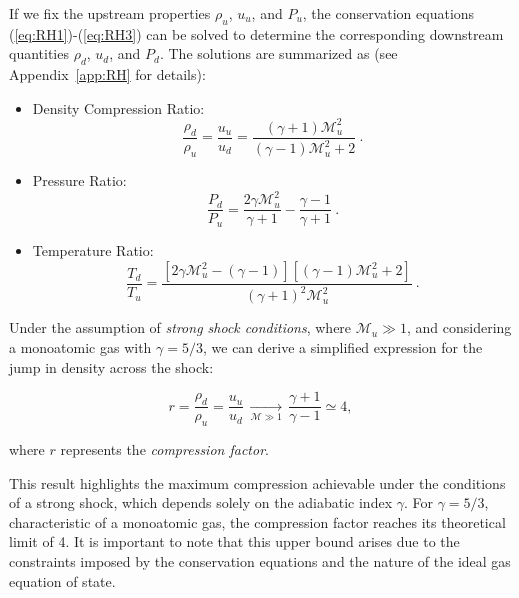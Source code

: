 If we fix the upstream properties \( \rho_u \), \( u_u \), and \( P_u \), the conservation equations (\ref{eq:RH1})-(\ref{eq:RH3}) can be solved to determine the corresponding downstream quantities \( \rho_d \), \( u_d \), and \( P_d \). The solutions are summarized as (see Appendix~\ref{app:RH} for details):
%
\begin{itemize}
\item Density Compression Ratio:  
\begin{equation}
\frac{\rho_d}{\rho_u} = \frac{u_u}{u_d} = \frac{(\gamma + 1) \mathcal{M}_u^2}{(\gamma - 1) \mathcal{M}_u^2 + 2}~.
\end{equation}

\item Pressure Ratio:
\begin{equation}
\frac{P_d}{P_u} = \frac{2\gamma \mathcal{M}_u^2}{\gamma + 1} - \frac{\gamma - 1}{\gamma + 1}~.
\end{equation}

\item Temperature Ratio:
\begin{equation}
\frac{T_d}{T_u} = \frac{\left[ 2\gamma \mathcal{M}_u^2 - (\gamma - 1) \right] \left[ (\gamma - 1) \mathcal{M}_u^2 + 2 \right]}{(\gamma + 1)^2 \mathcal{M}_u^2}~.
\end{equation}
\end{itemize}

Under the assumption of \emph{strong shock conditions}, where \( \mathcal{M}_u \gg 1 \), and considering a monoatomic gas with \( \gamma = 5/3 \), we can derive a simplified expression for the jump in density across the shock:
%
\begin{remark}
\begin{equation}
r = \frac{\rho_d}{\rho_u} = \frac{u_u}{u_d} \, \underset{\mathcal{M} \gg 1}{\longrightarrow} \, \frac{\gamma + 1}{\gamma - 1} \simeq 4,
\end{equation}
\end{remark}
%
where \( r \) represents the \emph{compression factor}.

This result highlights the maximum compression achievable under the conditions of a strong shock, which depends solely on the adiabatic index \( \gamma \). For \( \gamma = 5/3 \), characteristic of a monoatomic gas, the compression factor reaches its theoretical limit of 4. It is important to note that this upper bound arises due to the constraints imposed by the conservation equations and the nature of the ideal gas equation of state.

